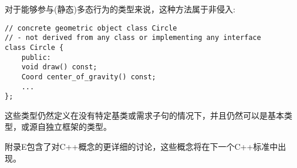 对于能够参与(静态)多态行为的类型来说，这种方法属于非侵入:

\begin{lstlisting}[style=styleCXX]
// concrete geometric object class Circle
// - not derived from any class or implementing any interface
class Circle {
	public:
	void draw() const;
	Coord center_of_gravity() const;
	...
};
\end{lstlisting}

这些类型仍然定义在没有特定基类或需求子句的情况下，并且仍然可以是基本类型，或源自独立框架的类型。

附录E包含了对C++概念的更详细的讨论，这些概念将在下一个C++标准中出现。



















